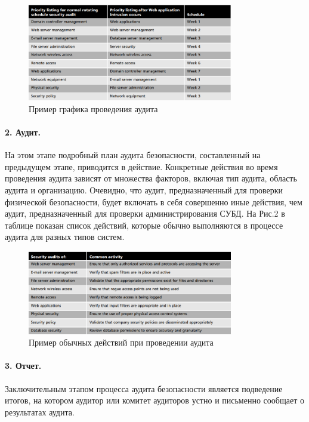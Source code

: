 \begin{figure}[h!]
    \centering
    \includegraphics[width=0.8\textwidth]{assets/Schedule_audit}
    \caption{Пример графика проведения аудита}
\end{figure}

\paragraph{2. Аудит.}

На этом этапе подробный план аудита безопасности, составленный на предыдущем этапе, приводится в действие. Конкретные действия во время проведения аудита зависят от множества факторов, включая тип аудита, область аудита и организацию. Очевидно, что аудит, предназначенный для проверки физической безопасности, будет включать в себя совершенно иные действия, чем аудит, предназначенный для проверки администрирования СУБД. На Рис.2 в таблице показан список действий, которые обычно выполняются в процессе аудита для разных типов систем.

\begin{figure}[h!]
    \centering
    \includegraphics[width=0.8\textwidth]{assets/Common_actions_audit}
    \caption{Пример обычных действий при проведении аудита}
\end{figure}

\paragraph{3. Отчет.}

Заключительным этапом процесса аудита безопасности является подведение итогов, на котором аудитор или комитет аудиторов устно и письменно сообщает о результатах аудита.

